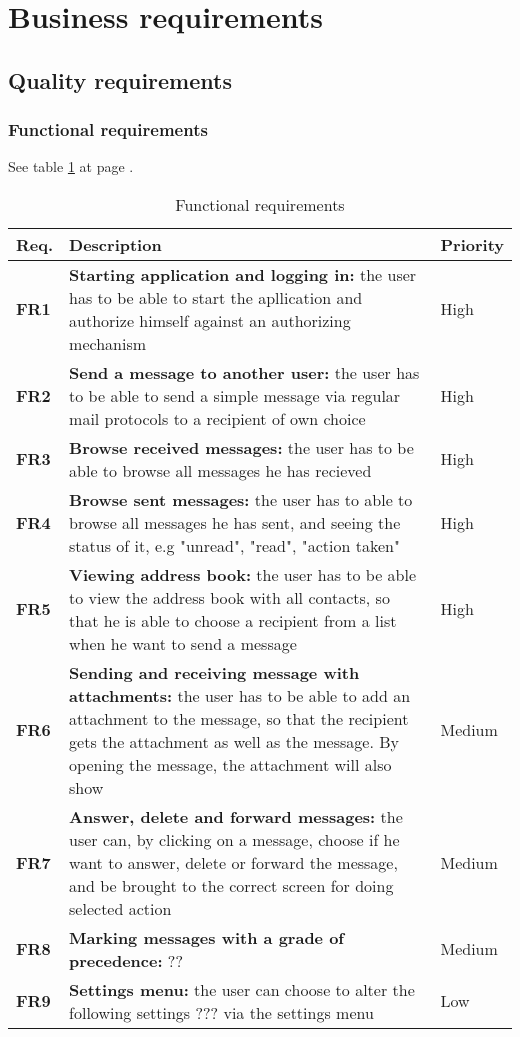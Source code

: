 

\section{Business requirements}

\subsection{Quality requirements}

\subsubsection{Functional requirements}
See table \ref{tab:functionalreq} at page \pageref{tab:functionalreq}.

\begin{table}
\begin{tabularx}{\linewidth}{>{\setlength\hsize{.2\hsize}}X|>{\setlength\hsize{1.8\hsize}}X|>{\setlength\hsize{0.3\hsize}}X}
\textbf{Req.} & \textbf{Description} & \textbf{Priority} \\ \hline \hline
\textbf{FR1} & \textbf{Starting application and logging in:} the user has to be able to start the apllication and authorize himself against an authorizing mechanism & High \\ \hline
\textbf{FR2} & \textbf{Send a message to another user:} the user has to be able to send a simple message via regular mail protocols to a recipient of own choice & High \\ \hline
\textbf{FR3} & \textbf{Browse received messages:} the user has to be able to browse all messages he has recieved & High \\ \hline
\textbf{FR4} & \textbf{Browse sent messages:} the user has to able to browse all messages he has sent, and seeing the status of it, e.g "unread", "read", "action taken" & High \\ \hline
\textbf{FR5} & \textbf{Viewing address book:} the user has to be able to view the address book with all contacts, so that he is able to choose a recipient from a list when he want to send a message & High \\ \hline
\textbf{FR6} & \textbf{Sending and receiving message with attachments:} the user has to be able to add an attachment to the message, so that the recipient gets the attachment as well as the message. By opening the message, the attachment will also show & Medium \\ \hline
\textbf{FR7} & \textbf{Answer, delete and forward messages:} the user can, by clicking on a message, choose if he want to answer, delete or forward the message, and be brought to the correct screen for doing selected action & Medium \\ \hline
\textbf{FR8} & \textbf{Marking messages with a grade of precedence:} ?? & Medium \\ \hline
\textbf{FR9} & \textbf{Settings menu:} the user can choose to alter the following settings ??? via the settings menu & Low
\end{tabularx}
\caption{Functional requirements} \label{tab:functionalreq}
\end{table}

